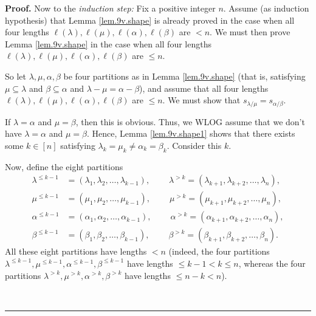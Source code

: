 \documentclass[numbers=enddot,12pt,final,onecolumn,notitlepage]{scrartcl}%
\theoremstyle{definition}
\newenvironment{proof}[1][Proof]{\noindent\textbf{#1.} }{\ \rule{0.5em}{0.5em}}
\begin{document}
\begin{enumerate}
\begin{proof}
Now to the \textit{induction step:} Fix a positive integer $n$. Assume (as
induction hypothesis) that Lemma \ref{lem.9v.shape} is already proved in the
case when all four lengths $\ell\left(  \lambda\right)  ,\ell\left(
\mu\right)  ,\ell\left(  \alpha\right)  ,\ell\left(  \beta\right)  $ are $<n$.
We must then prove Lemma \ref{lem.9v.shape} in the case when all four lengths
$\ell\left(  \lambda\right)  ,\ell\left(  \mu\right)  ,\ell\left(
\alpha\right)  ,\ell\left(  \beta\right)  $ are $\leq n$.

So let $\lambda,\mu,\alpha,\beta$ be four partitions as in Lemma
\ref{lem.9v.shape} (that is, satisfying $\mu\subseteq\lambda$ and
$\beta\subseteq\alpha$ and $\lambda-\mu=\alpha-\beta$), and assume that all
four lengths $\ell\left(  \lambda\right)  ,\ell\left(  \mu\right)
,\ell\left(  \alpha\right)  ,\ell\left(  \beta\right)  $ are $\leq n$. We must
show that $s_{\lambda/\mu}=s_{\alpha/\beta}$.

If $\lambda=\alpha$ and $\mu=\beta$, then this is obvious. Thus, we WLOG
assume that we don't have $\lambda=\alpha$ and $\mu=\beta$. Hence, Lemma
\ref{lem.9v.shape1} shows that there exists some $k\in\left[  n\right]  $
satisfying $\lambda_{k}=\mu_{k}\neq\alpha_{k}=\beta_{k}$. Consider this $k$.

Now, define the eight partitions
\begin{align*}
\lambda^{\leq k-1}  &  =\left(  \lambda_{1},\lambda_{2},\ldots,\lambda
_{k-1}\right)  ,\ \ \ \ \ \ \ \ \ \ \lambda^{>k}=\left(  \lambda_{k+1}%
,\lambda_{k+2},\ldots,\lambda_{n}\right)  ,\\
\mu^{\leq k-1}  &  =\left(  \mu_{1},\mu_{2},\ldots,\mu_{k-1}\right)
,\ \ \ \ \ \ \ \ \ \ \mu^{>k}=\left(  \mu_{k+1},\mu_{k+2},\ldots,\mu
_{n}\right)  ,\\
\alpha^{\leq k-1}  &  =\left(  \alpha_{1},\alpha_{2},\ldots,\alpha
_{k-1}\right)  ,\ \ \ \ \ \ \ \ \ \ \alpha^{>k}=\left(  \alpha_{k+1}%
,\alpha_{k+2},\ldots,\alpha_{n}\right)  ,\\
\beta^{\leq k-1}  &  =\left(  \beta_{1},\beta_{2},\ldots,\beta_{k-1}\right)
,\ \ \ \ \ \ \ \ \ \ \beta^{>k}=\left(  \beta_{k+1},\beta_{k+2},\ldots
,\beta_{n}\right)  .
\end{align*}
All these eight partitions have lengths $<n$ (indeed, the four partitions
$\lambda^{\leq k-1},\mu^{\leq k-1},\alpha^{\leq k-1},\beta^{\leq k-1}$ have
lengths $\leq k-1<k\leq n$, whereas the four partitions $\lambda^{>k},\mu
^{>k},\alpha^{>k},\beta^{>k}$ have lengths $\leq n-k<n$).


\end{proof}
\end{enumerate}
\end{document}
